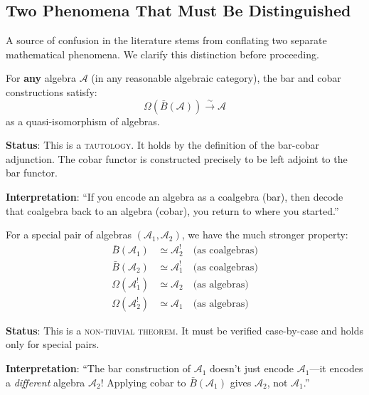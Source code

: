 \subsection{Two Phenomena That Must Be Distinguished}
\label{subsec:two-phenomena-distinguished}

A source of confusion in the literature stems from conflating two separate mathematical 
phenomena. We clarify this distinction before proceeding.

\begin{definition}
\label{def:bar-cobar-inversion}
For \textbf{any} algebra $\mathcal{A}$ (in any reasonable algebraic category), the 
bar and cobar constructions satisfy:
$$\Omega(\bar{B}(\mathcal{A})) \xrightarrow{\sim} \mathcal{A}$$
as a quasi-isomorphism of algebras.

\textbf{Status}: This is a \textsc{tautology}. It holds by the definition of the 
bar-cobar adjunction. The cobar functor is constructed precisely to be left adjoint 
to the bar functor.

\textbf{Interpretation}: ``If you encode an algebra as a coalgebra (bar), then decode 
that coalgebra back to an algebra (cobar), you return to where you started.''
\end{definition}

\begin{definition}
\label{def:koszul-duality-phenomenon}
For a special pair of algebras $(\mathcal{A}_1, \mathcal{A}_2)$, we have the much 
stronger property:
\begin{align}
\bar{B}(\mathcal{A}_1) &\simeq \mathcal{A}_2^! \quad \text{(as coalgebras)} \\
\bar{B}(\mathcal{A}_2) &\simeq \mathcal{A}_1^! \quad \text{(as coalgebras)} \\
\Omega(\mathcal{A}_1^!) &\simeq \mathcal{A}_2 \quad \text{(as algebras)} \\
\Omega(\mathcal{A}_2^!) &\simeq \mathcal{A}_1 \quad \text{(as algebras)}
\end{align}

\textbf{Status}: This is a \textsc{non-trivial theorem}. It must be verified case-by-case 
and holds only for special pairs.

\textbf{Interpretation}: ``The bar construction of $\mathcal{A}_1$ doesn't just encode 
$\mathcal{A}_1$—it encodes a \emph{different} algebra $\mathcal{A}_2$! Applying cobar 
to $\bar{B}(\mathcal{A}_1)$ gives $\mathcal{A}_2$, not $\mathcal{A}_1$.''
\end{definition}

